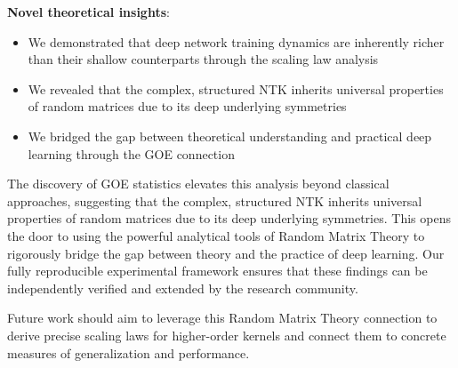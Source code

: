 \documentclass[a4paper]{article}
\theoremstyle{plain}
\theoremstyle{definition}
\theoremstyle{remark}
\begin{document}
\textbf{Novel theoretical insights}:
\begin{itemize}
    \item We demonstrated that deep network training dynamics are inherently richer than their shallow counterparts through the scaling law analysis
    \item We revealed that the complex, structured NTK inherits universal properties of random matrices due to its deep underlying symmetries
    \item We bridged the gap between theoretical understanding and practical deep learning through the GOE connection
\end{itemize}

The discovery of GOE statistics elevates this analysis beyond classical approaches, suggesting that the complex, structured NTK inherits universal properties of random matrices due to its deep underlying symmetries. This opens the door to using the powerful analytical tools of Random Matrix Theory to rigorously bridge the gap between theory and the practice of deep learning. Our fully reproducible experimental framework ensures that these findings can be independently verified and extended by the research community.

Future work should aim to leverage this Random Matrix Theory connection to derive precise scaling laws for higher-order kernels and connect them to concrete measures of generalization and performance.

\newpage
\end{document}
